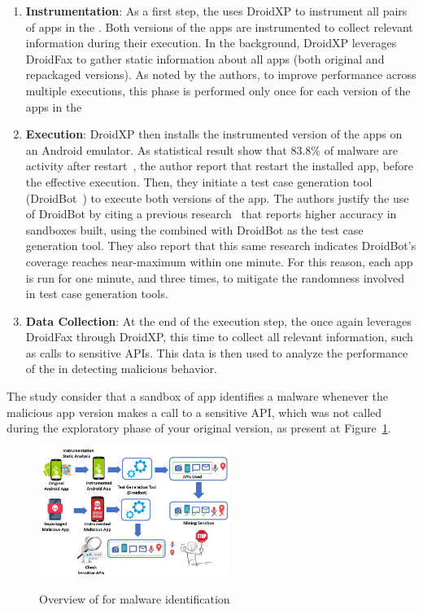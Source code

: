 \begin{enumerate}[1.]
 \item \textbf{Instrumentation}: As a first step, the \fhc uses DroidXP to instrument all pairs of apps in the \cds. Both versions of the apps are instrumented to collect relevant information during their execution. In the background, DroidXP leverages DroidFax to gather static information about all apps (both original and repackaged versions). As noted by the authors, to improve performance across multiple executions, this phase is performed only once for each version of the apps in the \cds


\item \textbf{Execution}: DroidXP then installs the instrumented version of the apps on an Android emulator. As statistical result show that $83.8\%$ of malware are activity after restart~\cite{DBLP:conf/sp/ZhouJ12}, the author report that restart the installed app, before the effective execution. Then, they initiate a test case generation tool (DroidBot~\cite{DBLP:conf/icse/LiYGC17}) to execute both versions of the app. The authors justify the use of DroidBot by citing a previous research~\cite{DBLP:conf/wcre/BaoLL18} that reports higher accuracy in sandboxes built, using the \mas combined with DroidBot as the test case generation tool. They also report that this same research indicates DroidBot’s coverage reaches near-maximum within one minute. For this reason, each app is run for one minute, and three times, to mitigate the randomness involved in test case generation tools.

\item \textbf{Data Collection}: At the end of the execution step, the \fhc once again leverages DroidFax through DroidXP, this time to collect all relevant information, such as calls to sensitive APIs. This data is then used to analyze the performance of the \mas in detecting malicious behavior.
\end{enumerate}



The study consider that a sandbox of app identifies a malware whenever the malicious app version makes a call to a sensitive API, which was not called during the exploratory phase of your original version, as present at Figure~\ref{fig:mine}.


\begin{figure}[h]
  \centering
  
    \includegraphics[width=0.55\textwidth]{image/mineSandbox.png} \\[\abovecaptionskip]
    
  \caption{Overview of \fhc for malware identification}\label{fig:mine}
\end{figure}


